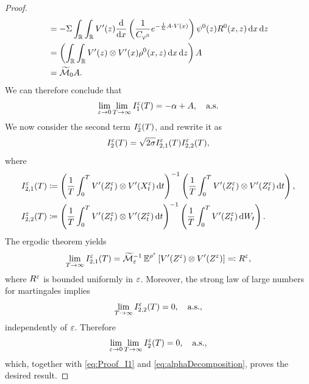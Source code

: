 \documentclass[10pt]{article}
\begin{document}
\begin{proof}
\begin{equation}
\begin{aligned}
	&= -\Sigma \int_{\mathbb{R}} \int_{\mathbb{R}} V'(z) \frac{\mathrm{d}}{\mathrm{d} x} \left ( \frac{1}{C_{\varphi^0}} e^{-\frac{1}{\Sigma} A\cdot V(x)} \right ) \psi^0(z) R^0(x,z) \,\mathrm{d} x \,\mathrm{d} z \\
	&= \left(\int_{\mathbb{R}} \int_{\mathbb{R}} V'(z) \otimes V'(x) \rho^0(x,z) \,\mathrm{d} x \,\mathrm{d} z\right)A\\
	&=  \widetilde {\mathcal M}_0 A.
\end{aligned}
\end{equation}
We can therefore conclude that
\begin{equation}\label{eq:Proof_I1}
\lim_{\varepsilon \to 0} \lim_{T \to \infty} I_1^\varepsilon(T) = -\alpha + A, \quad \text{a.s.}
\end{equation}
We now consider the second term $I_2^\varepsilon(T)$, and rewrite it as
\begin{equation}
	I^\varepsilon_2(T) = \sqrt{2\sigma} I_{2,1}^\varepsilon(T)  I_{2,2}^\varepsilon(T),
\end{equation}
where
\begin{equation}
\begin{aligned}
	I_{2,1}^\varepsilon(T) &\coloneqq \left(\frac{1}{T} \int_0^T V'(Z^\varepsilon_t) \otimes V'(X^\varepsilon_t) \,\mathrm{d} t\right)^{-1}\left(\frac{1}{T} \int_0^T V'(Z^\varepsilon_t) \otimes V'(Z^\varepsilon_t) \,\mathrm{d} t\right),\\
	I_{2,2}^\varepsilon(T) &\coloneqq \left(\frac{1}{T} \int_0^T V'(Z^\varepsilon_t) \otimes V'(Z^\varepsilon_t) \,\mathrm{d} t\right)^{-1} \left(\frac1T \int_0^T V'(Z^\varepsilon_t) \,\mathrm{d} W_t\right).
\end{aligned}
\end{equation}
The ergodic theorem yields
\begin{equation}
	\lim_{T \to \infty} I_{2,1}^\varepsilon(T) = \widetilde {\mathcal M}_\varepsilon^{-1}\operatorname{\mathbb{E}}^{\rho^\varepsilon}\left[V'(Z^\varepsilon) \otimes V'(Z^\varepsilon)\right] \eqqcolon R^\varepsilon,
\end{equation}
where $R^\varepsilon$ is bounded uniformly in $\varepsilon$. Moreover, the strong law of large numbers for martingales implies
\begin{equation}
	\lim_{T \to \infty} I_{2,2}^\varepsilon(T) = 0, \quad \text{a.s.},
\end{equation}
independently of $\varepsilon$. Therefore
\begin{equation}
	\lim_{\varepsilon \to 0}\lim_{T \to \infty} I_2^\varepsilon(T) = 0, \quad \text{a.s.},
\end{equation}
which, together with \eqref{eq:Proof_I1} and \eqref{eq:alphaDecomposition}, proves the desired result.
\end{proof}
\end{document}
